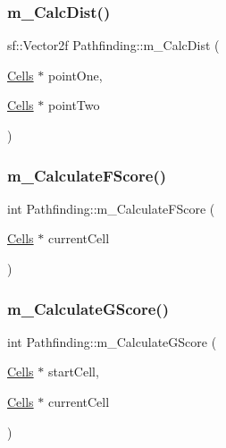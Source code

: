 \subsubsection{\texorpdfstring{m\+\_\+\+Calc\+Dist()}{m\_CalcDist()}}
{\footnotesize\ttfamily sf\+::\+Vector2f Pathfinding\+::m\+\_\+\+Calc\+Dist (\begin{DoxyParamCaption}\item[{\mbox{\hyperlink{class_cells}{Cells}} $\ast$}]{point\+One,  }\item[{\mbox{\hyperlink{class_cells}{Cells}} $\ast$}]{point\+Two }\end{DoxyParamCaption})}

\mbox{\label{class_pathfinding_a5df6c9a7c337bf4b416ff61dcf57dd98}} 
\subsubsection{\texorpdfstring{m\+\_\+\+Calculate\+F\+Score()}{m\_CalculateFScore()}}
{\footnotesize\ttfamily int Pathfinding\+::m\+\_\+\+Calculate\+F\+Score (\begin{DoxyParamCaption}\item[{\mbox{\hyperlink{class_cells}{Cells}} $\ast$}]{current\+Cell }\end{DoxyParamCaption})}

\mbox{\label{class_pathfinding_a717eed7fdd1fe504da934e575dfa1443}} 
\subsubsection{\texorpdfstring{m\+\_\+\+Calculate\+G\+Score()}{m\_CalculateGScore()}}
{\footnotesize\ttfamily int Pathfinding\+::m\+\_\+\+Calculate\+G\+Score (\begin{DoxyParamCaption}\item[{\mbox{\hyperlink{class_cells}{Cells}} $\ast$}]{start\+Cell,  }\item[{\mbox{\hyperlink{class_cells}{Cells}} $\ast$}]{current\+Cell }\end{DoxyParamCaption})}


